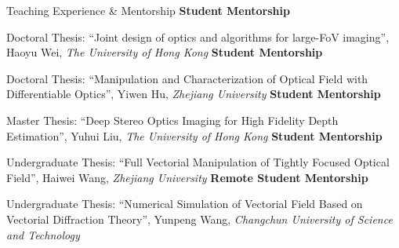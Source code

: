 \begin{rubric}{Teaching Experience \& Mentorship}
    \entry*[2022 -- Present]%
    \textbf{Student Mentorship}
    \par Doctoral Thesis: ``Joint design of optics and algorithms for large-FoV imaging'', Haoyu Wei, \textit{The University of Hong Kong}
    \entry*[2021 -- 2024]%
    \textbf{Student Mentorship}
    \par Doctoral Thesis: ``Manipulation and Characterization of Optical Field with Differentiable Optics'', Yiwen Hu, \textit{Zhejiang University}
    \entry*[2023]%
    \textbf{Student Mentorship}
    \par Master Thesis: ``Deep Stereo Optics Imaging for High Fidelity Depth Estimation'', Yuhui Liu, \textit{The University of Hong Kong}
    \entry*[2022]%
    \textbf{Student Mentorship}
    \par Undergraduate Thesis: ``Full Vectorial Manipulation of Tightly Focused Optical Field'', Haiwei Wang, \textit{Zhejiang University}
    \entry*[2022]%
    \textbf{Remote Student Mentorship}
    \par Undergraduate Thesis: ``Numerical Simulation of Vectorial Field Based on Vectorial Diffraction Theory'', Yunpeng Wang, \textit{Changchun University of Science and Technology}
\end{rubric}